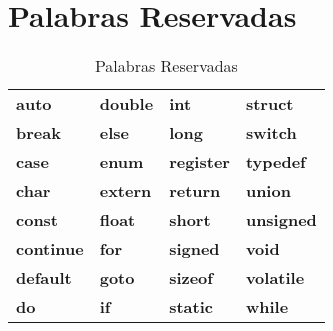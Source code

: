 \section [Palabras Reservadas]{Palabras Reservadas}
	\raggedright
	\begin{table}[htbp]
		\centering
		\caption{Palabras Reservadas}
		\begin{tabular}{llll}
			\rowcolor[rgb]{ .816,  .816,  .816} \textbf{auto} & \textbf{{double}} & \textbf{{int}} & \textbf{{struct}} \\
			\textbf{break} & \textbf{{else}} & \textbf{{long}} & \textbf{{switch}} \\
			\rowcolor[rgb]{ .816,  .816,  .816} \textbf{{case}} & \textbf{{enum}} & \textbf{{register}} & \textbf{{typedef}} \\
			\textbf{{char}} & \textbf{{extern}} & \textbf{{return}} & \textbf{{union}} \\
			\rowcolor[rgb]{ .816,  .816,  .816} \textbf{{const}} & \textbf{{float}} & \textbf{short} & \textbf{{unsigned}} \\
			\textbf{{continue}} & \textbf{{for}} & \textbf{{signed}} & \textbf{{void}} \\
			\rowcolor[rgb]{ .816,  .816,  .816} \textbf{default} & \textbf{{goto}} & \textbf{{sizeof}} & \textbf{{volatile}} \\
			\textbf{do} & \textbf{{if}} & \textbf{{static}} & \textbf{{while}} \\
		\end{tabular}
		\label{tab:palabrasReservadas}
	\end{table}
	



